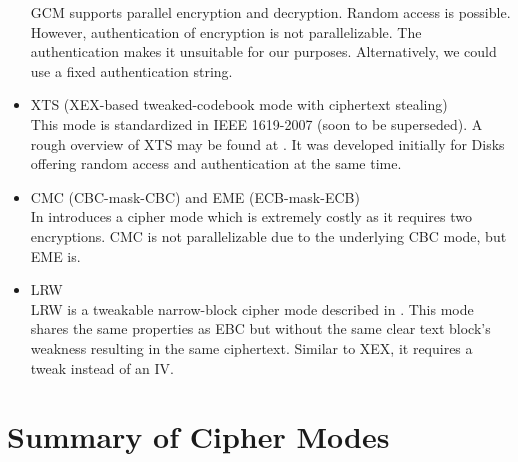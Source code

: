 \begin{itemize}
	GCM supports parallel encryption and decryption. Random access is possible. However, authentication of encryption is not parallelizable. The authentication makes it unsuitable for our purposes. Alternatively, we could use a fixed authentication string.
	\item XTS (XEX-based tweaked-codebook mode with ciphertext stealing)\\
	This mode is standardized in IEEE 1619-2007 (soon to be superseded). A rough overview of XTS may be found at \cite{Martin2010}. It was developed initially for Disks offering random access and authentication at the same time. 
	\item CMC (CBC-mask-CBC) and EME (ECB-mask-ECB)\\ 
	In \cite{Halevi:2003} \citeauthor{Halevi:2003} introduces a cipher mode which is extremely costly as it requires two encryptions. CMC is not parallelizable due to the underlying CBC mode, but EME is. 
	\item LRW\\
	LRW is a tweakable narrow-block cipher mode described in \cite{tschorsch:translayeranon}. This mode shares the same properties as EBC but without the same clear text block's weakness resulting in the same ciphertext. Similar to XEX, it requires a tweak instead of an IV.
\end{itemize}

\section{Summary of Cipher Modes}

